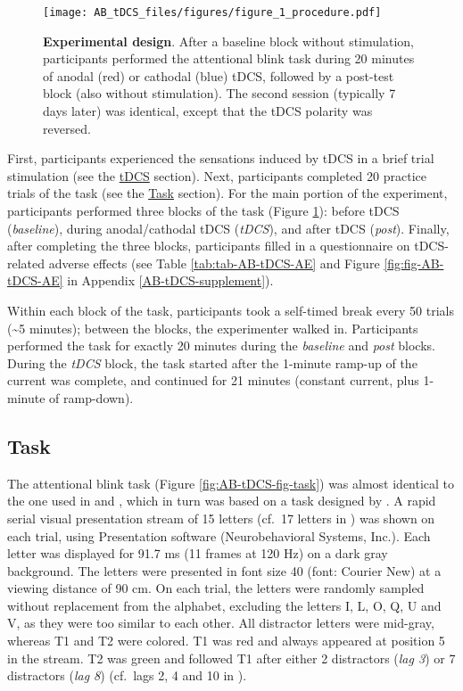 \documentclass[11pt,english,]{memoir}
\begin{document}
\begin{figure}
\centering
\texttt{[image: AB\_tDCS\_files/figures/figure\_1\_procedure.pdf]}
\caption{\label{fig:AB-tDCS-fig-procedure}\textbf{Experimental design}. After a baseline block without stimulation, participants performed the attentional blink task during 20 minutes of anodal (red) or cathodal (blue) tDCS, followed by a post-test block (also without stimulation). The second session (typically 7 days later) was identical, except that the tDCS polarity was reversed.}
\end{figure}

First, participants experienced the sensations induced by tDCS in a brief trial stimulation (see the \protect\hyperlink{AB_tDCS-tDCS}{tDCS} section). Next, participants completed 20 practice trials of the task (see the \protect\hyperlink{AB_tDCS-task}{Task} section). For the main portion of the experiment, participants performed three blocks of the task (Figure \ref{fig:AB-tDCS-fig-procedure}): before tDCS (\emph{baseline}), during anodal/cathodal tDCS (\emph{tDCS}), and after tDCS (\emph{post}). Finally, after completing the three blocks, participants filled in a questionnaire on tDCS-related adverse effects (see Table \ref{tab:tab-AB-tDCS-AE} and Figure \ref{fig:fig-AB-tDCS-AE} in Appendix \ref{AB-tDCS-supplement}).

Within each block of the task, participants took a self-timed break every 50 trials (\textasciitilde{}5 minutes); between the blocks, the experimenter walked in. Participants performed the task for exactly 20 minutes during the \emph{baseline} and \emph{post} blocks. During the \emph{tDCS} block, the task started after the 1-minute ramp-up of the current was complete, and continued for 21 minutes (constant current, plus 1-minute of ramp-down).



\hypertarget{AB_tDCS-task}{%
\subsection{Task}\label{AB_tDCS-task}}

The attentional blink task (Figure \ref{fig:AB-tDCS-fig-task}) was almost identical to the one used in \textcite{London2015} and \textcite{Slagter2013}, which in turn was based on a task designed by \textcite{Dux2008}. A rapid serial visual presentation stream of 15 letters (cf.~17 letters in \textcite{London2015}) was shown on each trial, using Presentation software (Neurobehavioral Systems, Inc.). Each letter was displayed for 91.7 ms (11 frames at 120 Hz) on a dark gray background. The letters were presented in font size 40 (font: Courier New) at a viewing distance of 90 cm. On each trial, the letters were randomly sampled without replacement from the alphabet, excluding the letters I, L, O, Q, U and V, as they were too similar to each other. All distractor letters were mid-gray, whereas T1 and T2 were colored. T1 was red and always appeared at position 5 in the stream. T2 was green and followed T1 after either 2 distractors (\emph{lag 3}) or 7 distractors (\emph{lag 8}) (cf.~lags 2, 4 and 10 in \textcite{London2015}).
\end{document}
